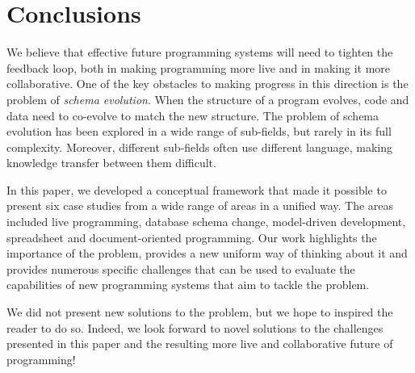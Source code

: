 \documentclass[english,submission]{programming}
\begin{document}
\section{Conclusions}
We believe that effective future programming systems will need to tighten the feedback loop,
both in making programming more live and in making it more collaborative. One of the key obstacles
to making progress in this direction is the problem of \emph{schema evolution}. When the structure
of a program evolves, code and data need to co-evolve to match the new structure.
%
The problem of schema evolution has been explored in a wide range of sub-fields, but rarely in its
full complexity. Moreover, different sub-fields often use different language, making knowledge
transfer between them difficult.

In this paper, we developed a conceptual framework
that made it possible to present six case studies from a wide range of areas in a unified way.
The areas included live programming, database schema change, model-driven development,
spreadsheet and document-oriented programming.
%
Our work highlights the importance
of the problem, provides a new uniform way of thinking about it and provides numerous specific
challenges that can be used to evaluate the capabilities of new programming systems that aim
to tackle the problem.

We did not present new solutions to the problem, but we hope to inspired the reader to
do so. Indeed, we look forward to novel solutions to the challenges presented in this paper and
the resulting more live and collaborative future of programming!



%
%
\printbibliography


\end{document}

